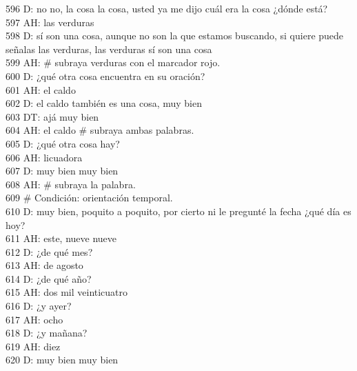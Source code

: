 596 D: no no, la cosa la cosa, usted ya me dijo cuál era la cosa ¿dónde está?\\
597 AH: las verduras\\
598 D: sí son una cosa, aunque no son la que estamos buscando, si quiere puede señalas las verduras, las verduras sí son una cosa\\
599 AH: \# subraya verduras con el marcador rojo.\\
600 D: ¿qué otra cosa encuentra en su oración?\\
601 AH: el caldo\\
602 D: el caldo también es una cosa, muy bien\\
603 DT: ajá muy bien\\
604 AH: el caldo \# subraya ambas palabras.\\
605 D: ¿qué otra cosa hay?\\
606 AH: licuadora\\
607 D: muy bien muy bien\\
608 AH: \# subraya la palabra.\\
609 \# Condición: orientación temporal.\\
610 D: muy bien, poquito a poquito, por cierto ni le pregunté la fecha ¿qué día es hoy?\\
611 AH: este, nueve nueve\\
612 D: ¿de qué mes?\\
613 AH: de agosto\\
614 D: ¿de qué año?\\
615 AH: dos mil veinticuatro\\
616 D: ¿y ayer?\\
617 AH: ocho\\
618 D: ¿y mañana?\\
619 AH: diez\\
620 D: muy bien muy bien\\
